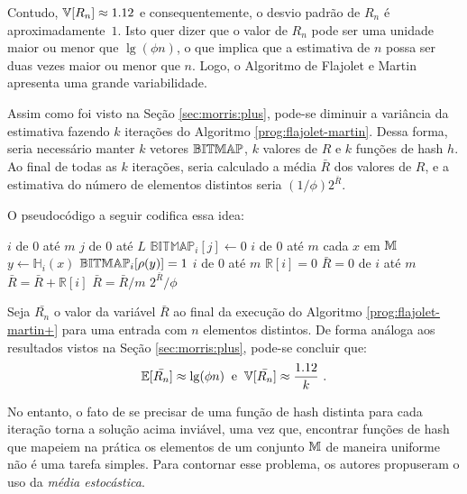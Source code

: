 Contudo, $\Vbb[R_n] \approx\nolinebreak 1.12$ e consequentemente, o desvio padrão de $R_n$ é aproximadamente~$1$. 
Isto quer dizer que o valor de $R_n$ pode ser uma unidade maior ou menor que $\lg(\phi n)$, o que implica que a 
estimativa de $n$ possa ser duas vezes maior ou menor que $n$. Logo, o Algoritmo de Flajolet e Martin apresenta uma 
grande variabilidade.

Assim como foi visto na Seção \ref{sec:morris:plus}, pode-se diminuir a variância da estimativa fazendo $k$ iterações 
do Algoritmo \ref{prog:flajolet-martin}. Dessa forma, seria necessário manter $k$ vetores $\mathbb{BITMAP}$, $k$ valores de $R$ e 
$k$ funções de hash $h$. Ao final de todas as $k$ iterações, seria calculado a média $\bar{R}$ dos valores de $R$, e a 
estimativa do número de elementos distintos seria $(1 \slash \phi) 2^{\bar{R}}$.

O pseudocódigo a seguir codifica essa idea:
\begin{codebox}
  \li \For $i$ de $0$ até $m$
      \Do
  \li    \For $j$ de $0$ até $L$
          \Do
  \li       $\mathbb{BITMAP}_{i}[j] \gets 0$
          \End
      \End
  \li \For $i$ de $0$ até $m$
      \Do
  \li    \For cada $x$ em $\mathbb{M}$
          \Do
  \li       $y \gets \mathbb{H}_{i}(x)$
  \li       $\mathbb{BITMAP}_i[\rho(y)] = 1$
          \End
      \End
  \li \For $i$ de $0$ até $m$
      \Do
  \li    $\mathbb{R}[i] = 0$
      \End
  \li $\bar{R} = 0$
  \li \For de $i$ até $m$
      \Do
  \li $\bar{R} = \bar{R} + \mathbb{R}[i]$
      \End
  \li $\bar{R} = \bar{R} / m$
  \li
  \Return $2^{\bar{R}}/\phi$
  \End
\end{codebox}

Seja $\bar{R_n}$ o valor da variável $\bar{R}$ ao final da execução do Algoritmo \ref{prog:flajolet-martin+} para uma
entrada com $n$ elementos distintos. De forma análoga aos resultados vistos na Seção \ref{sec:morris:plus}, pode-se
concluir que:
\[ \Ebb[\bar{R_n}] \approx \lg(\phi n)  \; \; \text{e}  \; \; \Vbb[\bar{R_n}] \approx \frac{1.12}{k} \ . \]


No entanto, o fato de se precisar de uma função de hash distinta para cada iteração torna a solução acima inviável, 
uma vez que, encontrar funções de hash que mapeiem na prática os elementos de um conjunto $\mathbb{M}$ de maneira
uniforme não é uma tarefa simples. Para contornar esse problema, os autores propuseram o uso da 
\textit{média estocástica}.

